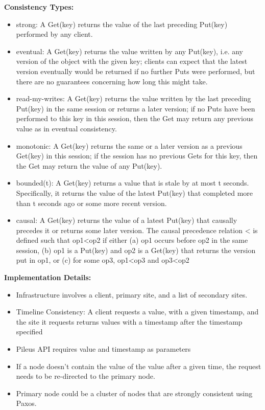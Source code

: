 \documentclass[a4paper]{article}
\begin{document}
\textbf{Consistency Types:}
\begin{itemize}
    \item
    strong: A Get(key) returns the value of the last
    preceding Put(key) performed by any client.
    \item
    eventual: A Get(key) returns the value written by
    any Put(key), i.e. any version of the object with the
    given key; clients can expect that the latest version
    eventually would be returned if no further Puts
    were performed, but there are no guarantees
    concerning how long this might take.
    \item
    read-my-writes: A Get(key) returns the value
    written by the last preceding Put(key) in the same
    session or returns a later version; if no Puts have
    been performed to this key in this session, then the
    Get may return any previous value as in eventual
    consistency.
    \item
    monotonic: A Get(key) returns the same or a later
    version as a previous Get(key) in this session; if the
    session has no previous Gets for this key, then the
    Get may return the value of any Put(key).
    \item
    bounded(t): A Get(key) returns a value that is stale
    by at most t seconds. Specifically, it returns the
    value of the latest Put(key) that completed more
    than t seconds ago or some more recent version.
    \item
    causal: A Get(key) returns the value of a latest
    Put(key) that causally precedes it or returns some
    later version. The causal precedence relation < is
    defined such that op1<op2 if either
    (a) op1 occurs before op2 in the same session,
    (b) op1 is a Put(key) and op2 is a Get(key) that
    returns the version put in op1, or
    (c) for some op3, op1<op3 and op3<op2
\end{itemize}

\textbf{Implementation Details:}
\begin{itemize}
    \item 
    Infrastructure involves a client, primary site, and a list of secondary sites.
    \item 
    Timeline Consistency: A client requests a value, with a given timestamp, and the site it requests returns values with a timestamp after the timestamp specified
    \item 
    Pileus API requires value and timestamp as parameters
    \item 
    If a node doesn't contain the value of the value after a given time, the request needs to be re-directed to the primary node.
    \item 
    Primary node could be a cluster of nodes that are strongly consistent using Paxos.
\end{itemize}
\end{document}
